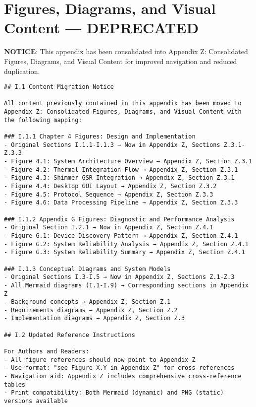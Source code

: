 \chapter{Figures, Diagrams, and Visual Content — DEPRECATED}

\textbf{NOTICE}: This appendix has been consolidated into Appendix Z: Consolidated Figures, Diagrams, and Visual Content for improved navigation and reduced duplication.

\begin{verbatim}
## I.1 Content Migration Notice

All content previously contained in this appendix has been moved to Appendix Z: Consolidated Figures, Diagrams, and Visual Content with the following mapping:

### I.1.1 Chapter 4 Figures: Design and Implementation
- Original Sections I.1.1-I.1.3 → Now in Appendix Z, Sections Z.3.1-Z.3.3
- Figure 4.1: System Architecture Overview → Appendix Z, Section Z.3.1
- Figure 4.2: Thermal Integration Flow → Appendix Z, Section Z.3.1
- Figure 4.3: Shimmer GSR Integration → Appendix Z, Section Z.3.1
- Figure 4.4: Desktop GUI Layout → Appendix Z, Section Z.3.2
- Figure 4.5: Protocol Sequence → Appendix Z, Section Z.3.3
- Figure 4.6: Data Processing Pipeline → Appendix Z, Section Z.3.3

### I.1.2 Appendix G Figures: Diagnostic and Performance Analysis
- Original Section I.2.1 → Now in Appendix Z, Section Z.4.1
- Figure G.1: Device Discovery Pattern → Appendix Z, Section Z.4.1
- Figure G.2: System Reliability Analysis → Appendix Z, Section Z.4.1
- Figure G.3: System Reliability Summary → Appendix Z, Section Z.4.1

### I.1.3 Conceptual Diagrams and System Models
- Original Sections I.3-I.5 → Now in Appendix Z, Sections Z.1-Z.3
- All Mermaid diagrams (I.1-I.9) → Corresponding sections in Appendix Z
- Background concepts → Appendix Z, Section Z.1
- Requirements diagrams → Appendix Z, Section Z.2
- Implementation diagrams → Appendix Z, Section Z.3

## I.2 Updated Reference Instructions

For Authors and Readers:
- All figure references should now point to Appendix Z
- Use format: "see Figure X.Y in Appendix Z" for cross-references
- Navigation aid: Appendix Z includes comprehensive cross-reference tables
- Print compatibility: Both Mermaid (dynamic) and PNG (static) versions available


\end{verbatim}
